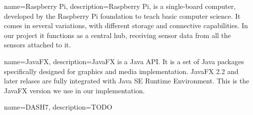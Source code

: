 \documentclass[../document]{subfiles}
\begin{document}
{
   name=Raspberry Pi,
   description={Raspberry Pi, is a single-board computer, developed by the Raspberry Pi foundation to teach basic computer science. It comes in several variations, with different storage and connective capabilities. In our project it functions as a central hub, receiving sensor data from all the sensors attached to it.}
}

{
   name=JavaFX,
   description={JavaFX is a Java API. It is a set of Java packages specifically designed for graphics and media implementation. JavaFX 2.2 and later relases are fully integrated with Java SE Runtime Environment. This is the JavaFX version we use in our implementation.}
}

{
   name=DASH7,
   description={TODO}
}
\end{document}
